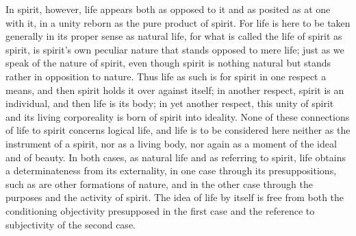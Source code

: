 In spirit, however, life appears
both as opposed to it and as posited as at one with it,
in a unity reborn as the pure product of spirit.
For life is here to be taken generally in
its proper sense as natural life,
for what is called the life of spirit as spirit,
is spirit's own peculiar nature
that stands opposed to mere life;
just as we speak of the nature of spirit,
even though spirit is nothing natural
but stands rather in opposition to nature.
Thus life as such is for spirit in one respect a means,
and then spirit holds it over against itself;
in another respect, spirit is an individual,
and then life is its body;
in yet another respect, this unity of spirit
and its living corporeality is
born of spirit into ideality.
None of these connections of life to spirit
concerns logical life,
and life is to be considered here
neither as the instrument of a spirit,
nor as a living body,
nor again as a moment of the ideal and of beauty.
In both cases, as natural life and as referring to spirit,
life obtains a determinateness from its externality,
in one case through its presuppositions,
such as are other formations of nature,
and in the other case through the
purposes and the activity of spirit.
The idea of life by itself is free
from both the conditioning objectivity
presupposed in the first case
and the reference to subjectivity
of the second case.


